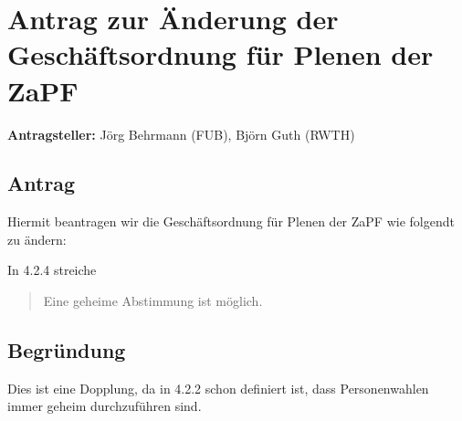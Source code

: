 \documentclass[draft,10pt,oneside]{scrartcl}
\begin{document}
\newpage

\section*{Antrag zur Änderung der Geschäftsordnung für Plenen der ZaPF}

\textbf{Antragsteller:} Jörg Behrmann (FUB), Björn Guth (RWTH)

\subsection*{Antrag}

Hiermit beantragen wir die Geschäftsordnung für Plenen der ZaPF wie folgendt zu ändern:

In 4.2.4 streiche
\begin{quote}
	Eine geheime Abstimmung ist möglich.
\end{quote}

\subsection*{Begründung}
Dies ist eine Dopplung, da in 4.2.2 schon definiert ist, dass Personenwahlen immer geheim durchzuführen sind.
\end{document}
